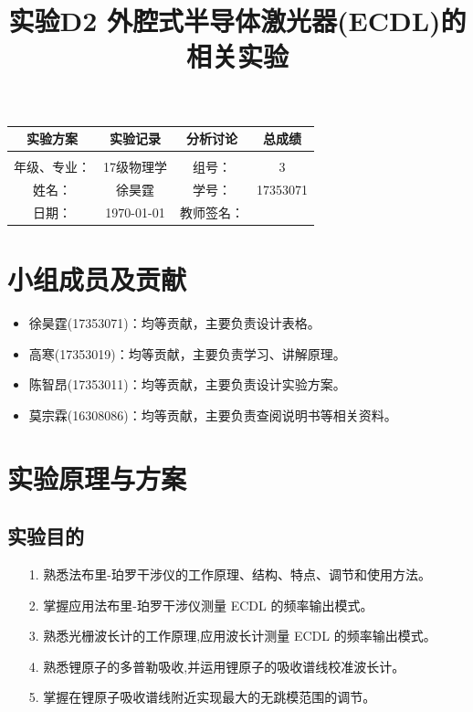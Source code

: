 \documentclass[10pt,a4paper]{ctexart}
\title{实验D2 外腔式半导体激光器(ECDL)的相关实验}
\date{}
\begin{document}
\maketitle
\begin{center}
\begin{tabular}{|c|c|c|c|}
\hline
		实验方案 &实验记录  &分析讨论 &总成绩\\
		\hline
		        &          &          &  \\
	    \hline
	\hline 
	年级、专业： &17级物理学 &组号：& 3 \\
	\hline
	姓名：& 徐昊霆 &学号：&17353071  \\
	\hline
	日期：& \today &教师签名： &  \\
    \hline	
\end{tabular}
\end{center}
\setcounter{section}{-1}
\section{小组成员及贡献}    
\begin{itemize}
	\item 徐昊霆(17353071)：均等贡献，主要负责设计表格。
	\item 高寒(17353019)：均等贡献，主要负责学习、讲解原理。
	\item 陈智昂(17353011)：均等贡献，主要负责设计实验方案。
	\item 莫宗霖(16308086)：均等贡献，主要负责查阅说明书等相关资料。
\end{itemize}

    
\newpage
\tableofcontents
\newpage
\section{实验原理与方案}
\subsection{实验目的}
\begin{enumerate}
 \item[1.] 熟悉法布里-珀罗干涉仪的工作原理、结构、特点、调节和使用方法。
  \item[2.] 掌握应用法布里-珀罗干涉仪测量 ECDL 的频率输出模式。
\item[3.] 熟悉光栅波长计的工作原理,应用波长计测量 ECDL 的频率输出模式。
\item[4.] 熟悉锂原子的多普勒吸收,并运用锂原子的吸收谱线校准波长计。
\item[5.] 掌握在锂原子吸收谱线附近实现最大的无跳模范围的调节。
\end{enumerate}
\end{document}
